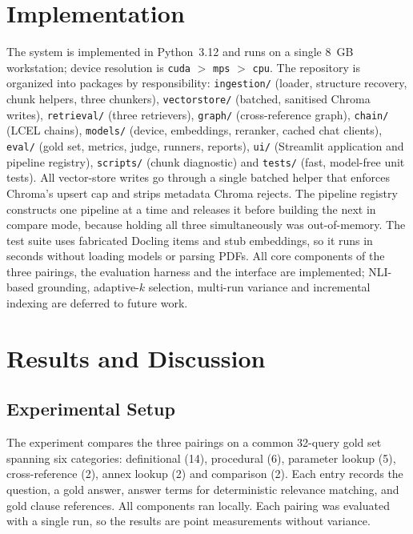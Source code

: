 \documentclass[conference]{IEEEtran}
\begin{document}
\section{Implementation}
The system is implemented in Python~3.12 and runs on a single 8~GB workstation; device resolution is \texttt{cuda} $>$ \texttt{mps} $>$ \texttt{cpu}. The repository is organized into packages by responsibility: \texttt{ingestion/} (loader, structure recovery, chunk helpers, three chunkers), \texttt{vectorstore/} (batched, sanitised Chroma writes), \texttt{retrieval/} (three retrievers), \texttt{graph/} (cross-reference graph), \texttt{chain/} (LCEL chains), \texttt{models/} (device, embeddings, reranker, cached chat clients), \texttt{eval/} (gold set, metrics, judge, runners, reports), \texttt{ui/} (Streamlit application and pipeline registry), \texttt{scripts/} (chunk diagnostic) and \texttt{tests/} (fast, model-free unit tests). All vector-store writes go through a single batched helper that enforces Chroma's upsert cap and strips metadata Chroma rejects. The pipeline registry constructs one pipeline at a time and releases it before building the next in compare mode, because holding all three simultaneously was out-of-memory. The test suite uses fabricated Docling items and stub embeddings, so it runs in seconds without loading models or parsing PDFs. All core components of the three pairings, the evaluation harness and the interface are implemented; NLI-based grounding, adaptive-$k$ selection, multi-run variance and incremental indexing are deferred to future work.

\section{Results and Discussion}
\subsection{Experimental Setup}
The experiment compares the three pairings on a common 32-query gold set spanning six categories: definitional (14), procedural (6), parameter lookup (5), cross-reference (2), annex lookup (2) and comparison (2). Each entry records the question, a gold answer, answer terms for deterministic relevance matching, and gold clause references. All components ran locally. Each pairing was evaluated with a single run, so the results are point measurements without variance.
\end{document}
